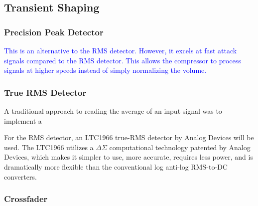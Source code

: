 \documentclass[10pt]{article}
\begin{document}
\begin{multicols*}{2}
\begin{minipage}{\linewidth}
                                
                            \label{plot:tanh}
                        
                        \end{minipage}
            
            \subsection{Transient Shaping}

                \subsubsection{Precision Peak Detector}
                    \textcolor{blue}{This is an alternative to the RMS detector. However, it excels at fast attack signals compared to the RMS detector. This allows the compressor to process signals at higher speeds instead of simply normalizing the volume.}  

                \subsubsection{True RMS Detector}
                    A traditional approach to reading the average of an input signal was to implement a 
                    
                    For the RMS detector, an LTC1966 true-RMS detector by Analog Devices will be used. The LTC1966 utilizes a $\Delta\Sigma$ computational technology patented by Analog Devices, which makes it simpler to use, more accurate, requires less power, and is dramatically more flexible than the conventional log anti-log RMS-to-DC converters.                 
                    
                \subsubsection{Crossfader}


\end{multicols*}
\end{document}
